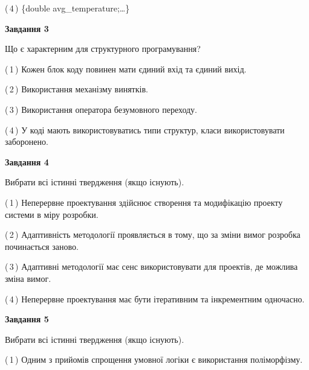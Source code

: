 \documentclass[10pt, ukrainian]{article}
\begin{document}
{\begin {large}
(\,4\,) \{double avg\_temperature;…\} %


{\begin {center}\textbf{Завдання 3}\end {center}}\par
Що є характерним для структурного програмування?\par
\vspace{2mm}



(\,1\,) Кожен блок коду повинен мати єдиний вхід та єдиний вихід.%



(\,2\,) Використання механізму винятків. %



(\,3\,) Використання оператора безумовного переходу. %



(\,4\,) У коді мають використовуватись типи структур, класи використовувати заборонено. %


{\begin {center}\textbf{Завдання 4}\end {center}}\par
Вибрати всі істинні твердження (якщо існують).\par
\vspace{2mm}



(\,1\,) Неперервне проектування здійснює створення та модифікацію проекту системи в міру розробки. %



(\,2\,) Адаптивність методології проявляється в тому, що за зміни вимог розробка починається заново. %



(\,3\,) Адаптивні методології має сенс використовувати для проектів, де можлива зміна вимог. %



(\,4\,) Неперервне проектування має бути ітеративним та інкрементним одночасно. %


{\begin {center}\textbf{Завдання 5}\end {center}}\par
Вибрати всі істинні твердження (якщо існують).\par
\vspace{2mm}



(\,1\,) Одним з прийомів спрощення умовної логіки є використання поліморфізму. %




\end{large}}
\end{document}
